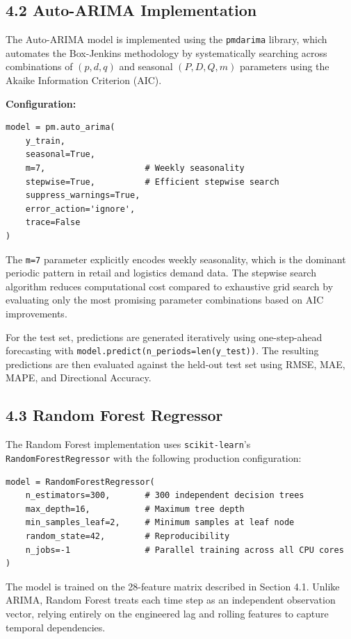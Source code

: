 \documentclass[12pt, a4paper]{report}
\begin{document}
\subsection{4.2 Auto-ARIMA Implementation}

The Auto-ARIMA model is implemented using the \texttt{pmdarima} library, which automates the Box-Jenkins methodology by systematically searching across combinations of $(p, d, q)$ and seasonal $(P, D, Q, m)$ parameters using the Akaike Information Criterion (AIC).

\textbf{Configuration:}
\begin{verbatim}
model = pm.auto_arima(
    y_train,
    seasonal=True,
    m=7,                    # Weekly seasonality
    stepwise=True,          # Efficient stepwise search
    suppress_warnings=True,
    error_action='ignore',
    trace=False
)
\end{verbatim}

The \texttt{m=7} parameter explicitly encodes weekly seasonality, which is the dominant periodic pattern in retail and logistics demand data. The stepwise search algorithm reduces computational cost compared to exhaustive grid search by evaluating only the most promising parameter combinations based on AIC improvements.

For the test set, predictions are generated iteratively using one-step-ahead forecasting with \texttt{model.predict(n\_periods=len(y\_test))}. The resulting predictions are then evaluated against the held-out test set using RMSE, MAE, MAPE, and Directional Accuracy.

\subsection{4.3 Random Forest Regressor}

The Random Forest implementation uses \texttt{scikit-learn}'s \texttt{RandomForestRegressor} with the following production configuration:

\begin{verbatim}
model = RandomForestRegressor(
    n_estimators=300,       # 300 independent decision trees
    max_depth=16,           # Maximum tree depth
    min_samples_leaf=2,     # Minimum samples at leaf node
    random_state=42,        # Reproducibility
    n_jobs=-1               # Parallel training across all CPU cores
)
\end{verbatim}

The model is trained on the 28-feature matrix described in Section 4.1. Unlike ARIMA, Random Forest treats each time step as an independent observation vector, relying entirely on the engineered lag and rolling features to capture temporal dependencies.
\end{document}
